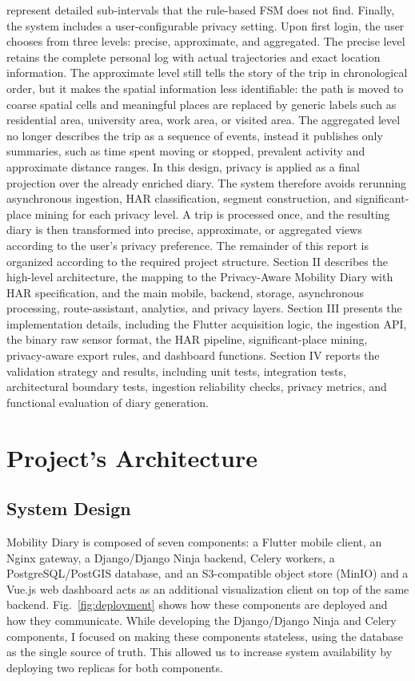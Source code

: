 \documentclass[conference,a4paper]{IEEEtran}
\begin{document}
represent detailed sub-intervals that the rule-based FSM does not find.  Finally, the system includes a user-configurable privacy setting. Upon first login, the user chooses from three levels: precise, approximate, and aggregated. The precise level retains the complete personal log with actual trajectories and exact location information. The approximate level still tells the story of the trip in chronological order, but it makes the spatial information less identifiable: the path is moved to coarse spatial cells and meaningful places are replaced by generic labels such as residential area, university area, work area, or visited area. The aggregated level no longer describes the trip as a sequence of events, instead it publishes only summaries, such as time spent moving or stopped, prevalent activity and approximate distance ranges. In this design, privacy is applied as a final projection over the already enriched diary. The system therefore avoids rerunning asynchronous ingestion, HAR classification, segment construction, and significant-place mining for each privacy level. A trip is processed once, and the resulting diary is then transformed into precise, approximate, or aggregated views according to the user’s privacy preference.  The remainder of this report is organized according to the required project structure. Section II describes the high-level architecture, the mapping to the Privacy-Aware Mobility Diary with HAR specification, and the main mobile, backend, storage, asynchronous processing, route-assistant, analytics, and privacy layers. Section III presents the implementation details, including the Flutter acquisition logic, the ingestion API, the binary raw sensor format, the HAR pipeline, significant-place mining, privacy-aware export rules, and dashboard functions. Section IV reports the validation strategy and results, including unit tests, integration tests, architectural boundary tests, ingestion reliability checks, privacy metrics, and functional evaluation of diary generation.
\section{Project's Architecture}

\subsection{System Design}

Mobility Diary is composed of seven components: a Flutter mobile client, an Nginx gateway, a Django/Django Ninja backend, Celery workers, a PostgreSQL/PostGIS database, and an S3-compatible object store (MinIO) and a Vue.js web dashboard acts as an additional visualization client on top of the same backend. Fig.~\ref{fig:deployment} shows how these components are deployed and how they communicate.
While developing the Django/Django Ninja and Celery components, I focused on making these components stateless, using the database as the single source of truth. This allowed us to increase system availability by deploying two replicas for both components.
\end{document}
